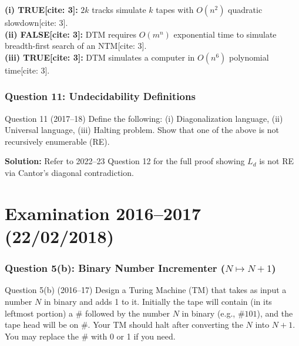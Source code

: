 \documentclass[11pt,a4paper]{article}
\begin{document}
\begin{solutionbox}
\textbf{(i) TRUE[cite: 3]:} $2k$ tracks simulate $k$ tapes with $O(n^2)$ quadratic slowdown[cite: 3]. \\
\textbf{(ii) FALSE[cite: 3]:} DTM requires $O(m^n)$ exponential time to simulate breadth-first search of an NTM[cite: 3]. \\
\textbf{(iii) TRUE[cite: 3]:} DTM simulates a computer in $O(n^6)$ polynomial time[cite: 3].
\end{solutionbox}

\section{Question 11: Undecidability Definitions}
\begin{questionbox}{Question 11 (2017--18)}
Define the following: (i) Diagonalization language, (ii) Universal language, (iii) Halting problem. Show that one of the above is not recursively enumerable (RE).
\end{questionbox}

\begin{solutionbox}
\textbf{Solution:} Refer to 2022--23 Question 12 for the full proof showing $L_d$ is not RE via Cantor's diagonal contradiction.
\end{solutionbox}

\part{Examination 2016--2017 (22/02/2018)}

\section{Question 5(b): Binary Number Incrementer ($N \mapsto N+1$)}
\begin{questionbox}{Question 5(b) (2016--17)}
Design a Turing Machine (TM) that takes as input a number $N$ in binary and adds 1 to it. Initially the tape will contain (in its leftmost portion) a $\#$ followed by the number $N$ in binary (e.g., $\#101$), and the tape head will be on $\#$. Your TM should halt after converting the $N$ into $N+1$. You may replace the $\#$ with 0 or 1 if you need.
\end{questionbox}
\end{document}
